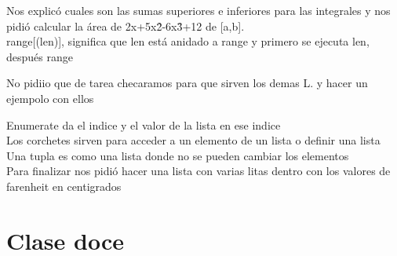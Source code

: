 \documentclass{book}
\begin{document}
Nos explicó cuales son las sumas superiores e inferiores para las integrales y nos pidió calcular la área de 2x+5x\^2-6x\^3+12
de [a,b].\\

\color{blue}range[(len)]\color{black}, significa que len está anidado a range y primero se ejecuta len, después range

No pidiio que de tarea checaramos para que sirven los demas L. y hacer un ejempolo con ellos

\color{blue}Enumerate \color{black} da el indice y el valor de la lista en ese indice\\
Los corchetes sirven para acceder a un elemento de un lista o definir una lista\\
Una \color{red}tupla \color{black} es como una lista donde no se pueden cambiar los elementos \\
Para finalizar nos pidió hacer una lista con varias litas dentro con los valores de farenheit en centigrados\\

\chapter{Clase doce}
\end{document}
